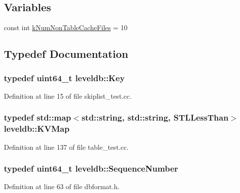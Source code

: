 \subsection*{Variables}
\begin{DoxyCompactItemize}
\item 
const int \hyperlink{namespaceleveldb_a550686b2c442f4c3011d68dd12c38662}{k\+Num\+Non\+Table\+Cache\+Files} = 10
\end{DoxyCompactItemize}


\subsection{Typedef Documentation}
\hypertarget{namespaceleveldb_a7e9a9725b13fa0bd922d885280dfab95}{}
\subsubsection[{Key}]{\setlength{\rightskip}{0pt plus 5cm}typedef {\bf uint64\+\_\+t} {\bf leveldb\+::\+Key}}\label{namespaceleveldb_a7e9a9725b13fa0bd922d885280dfab95}


Definition at line 15 of file skiplist\+\_\+test.\+cc.

\hypertarget{namespaceleveldb_aac1e50450147be263e08252c6700f7a7}{}
\subsubsection[{K\+V\+Map}]{\setlength{\rightskip}{0pt plus 5cm}typedef std\+::map$<$std\+::string, std\+::string, S\+T\+L\+Less\+Than$>$ {\bf leveldb\+::\+K\+V\+Map}}\label{namespaceleveldb_aac1e50450147be263e08252c6700f7a7}


Definition at line 137 of file table\+\_\+test.\+cc.

\hypertarget{namespaceleveldb_a5481ededd221c36d652c371249f869fa}{}
\subsubsection[{Sequence\+Number}]{\setlength{\rightskip}{0pt plus 5cm}typedef {\bf uint64\+\_\+t} {\bf leveldb\+::\+Sequence\+Number}}\label{namespaceleveldb_a5481ededd221c36d652c371249f869fa}


Definition at line 63 of file dbformat.\+h.



